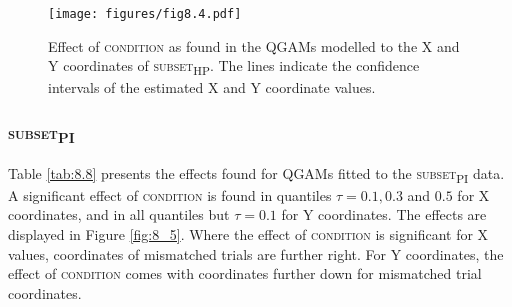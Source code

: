 \begin{figure}[p]
    \centering
    \texttt{[image: figures/fig8.4.pdf]}
    \caption{Effect of \textsc{condition} as found in the QGAMs modelled to the X and Y coordinates of \textsc{subset\textsubscript{HP}}. The lines indicate the confidence intervals of the estimated X and Y coordinate values.}
    \label{fig:8_4}
\end{figure}
\clearpage

\subsubsection{\textsc{subset\textsubscript{PI}}}\label{section08_2_2_3}

Table \ref{tab:8.8} presents the effects found for QGAMs fitted to the \textsc{subset\textsubscript{PI}} data. A significant effect of \textsc{condition} is found in quantiles $\tau=0.1,0.3$ and $0.5$ for X coordinates, and in all quantiles but $\tau=0.1$ for Y coordinates. The effects are displayed in Figure \ref{fig:8_5}. Where the effect of \textsc{condition} is significant for X values, coordinates of mismatched trials are further right. For Y coordinates, the effect of \textsc{condition} comes with coordinates further down for mismatched trial coordinates.

